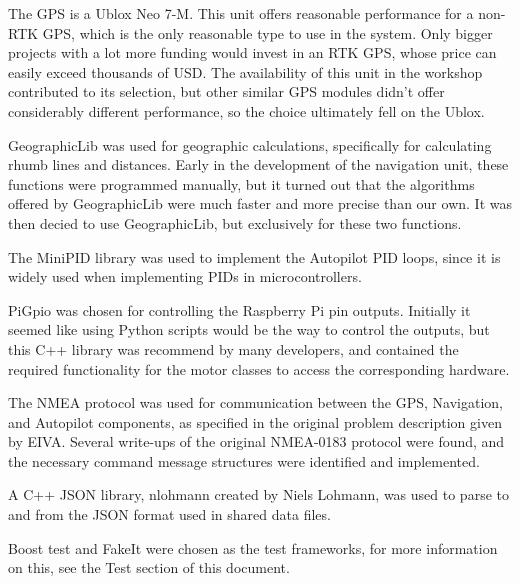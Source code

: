 The GPS is a Ublox Neo 7-M. This unit offers reasonable performance for a non-RTK GPS, which is the only reasonable type to use in the system. Only bigger projects with a lot more funding would invest in an RTK GPS, whose price can easily exceed thousands of USD. The availability of this unit in the workshop contributed to its selection, but other similar GPS modules didn't offer considerably different performance, so the choice ultimately fell on the Ublox.

GeographicLib was used for geographic calculations, specifically for calculating rhumb lines and distances. Early in the development of the navigation unit, these functions were programmed manually, but it turned out that the algorithms offered by GeographicLib were much faster and more precise than our own. It was then decied to use GeographicLib, but exclusively for these two functions.

The MiniPID library was used to implement the Autopilot PID loops, since it is widely used when implementing PIDs in microcontrollers.

PiGpio was chosen for controlling the Raspberry Pi pin outputs. Initially it seemed like using Python scripts would be the way to control the outputs, but this C++ library was recommend by many developers, and contained the required functionality for the motor classes to access the corresponding hardware.

The NMEA protocol was used for communication between the GPS, Navigation, and Autopilot components, as specified in the original problem description given by EIVA. Several write-ups of the original NMEA-0183 protocol were found, and the necessary command message structures were identified and implemented.

A C++ JSON library, nlohmann created by Niels Lohmann, was used to parse to and from the JSON format used in shared data files.

Boost test and FakeIt were chosen as the test frameworks, for more information on this, see the Test section of this document.